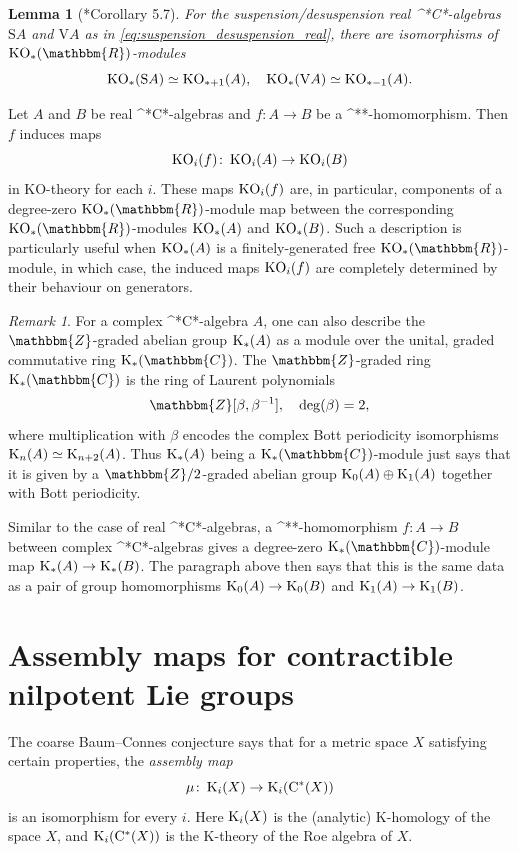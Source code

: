 \documentclass{amsart}
\numberwithin{figure}{section}
\numberwithin{equation}{section}
\numberwithin{table}{section}
\theoremstyle{plain}
\newtheorem{lemma}[equation]{Lemma}
\theoremstyle{definition}
\theoremstyle{remark}
\newtheorem{remark}[equation]{Remark}
\theoremstyle{nonumber}
\newcommand{\Z}{\mathbb{Z}}
\newcommand{\R}{\mathbb{R}}
\newcommand{\C}{\mathbb{C}}
\newcommand{\K}{\relax\ifmmode\operatorname{K}\else\textup{K}\fi}
\newcommand{\KO}{\relax\ifmmode\operatorname{KO}\else\textup{KO}\fi}
\newcommand{\st}{\relax\ifmmode{}^*\else{}\textup{*}\fi}
\newcommand{\Cst}{\relax\ifmmode\mathrm{C}^*\else\textup{C*}\fi}
\renewcommand{\mathbb}{\mathbbm} %
\begin{document}
\begin{lemma}[\cite{Boersema:Real_Cst-algebras_Kuenneth_formula}*{Corollary
5.7}]\label{lem:KO-theory_suspension_desuspension}
For the suspension/desuspension real \Cst-algebras \(\mathrm{S}A\)
and \(\mathrm{V}A\) as in \eqref{eq:suspension_desuspension_real},
there are isomorphisms of \( \KO_*(\R) \)-modules
\[ 
  \KO_*(\mathrm{S}A)\simeq\KO_{*+1}(A),\quad 
  \KO_*(\mathrm{V}A)\simeq\KO_{*-1}(A).
\]
\end{lemma}
Let \( A \) and \( B \) be real \Cst-algebras and \( f\colon A\to B \) be a
\st-homomorphism. Then \( f \) induces maps
\[
  \KO_i(f)\colon \KO_i(A)\to\KO_i(B)
\]
in KO-theory for each \( i \). These maps \( \KO_i(f) \) are, in
particular, components of a degree-zero
\( \KO_*(\R) \)-module map between the corresponding \(
\KO_*(\R) \)-modules \( \KO_*(A) \) and \( \KO_*(B) \).
Such a description is particularly useful 
  when \( \KO_*(A) \) is a finitely-generated 
  free \( \KO_*(\R) \)-module, in which case, the
induced maps \( \KO_i(f) \)  
are completely determined by their behaviour on
generators.


\begin{remark}\label{rmk:K-ring_of_C}
For a complex \Cst-algebra \( A \), one can also 
describe the \( \Z \)-graded abelian
group \( \K_*(A) \) as a module over the unital, graded commutative ring
\( \K_*(\C) \). The \( \Z \)-graded ring \( \K_*(\C) \) is the ring of Laurent polynomials
\[ 
  \Z[\beta,\beta^{-1}],\quad \deg(\beta)=2,
\]
where multiplication with \( \beta \) encodes the complex Bott periodicity
isomorphisms \( \K_n(A)\simeq\K_{n+2}(A) \). Thus
\( \K_*(A) \) being a \( \K_*(\C) \)-module just says that it is given by a
\( \Z/2 \)-graded abelian group \( \K_0(A)\oplus\K_1(A) \) together with
Bott periodicity.

Similar to the case of real \Cst-algebras,
a \st-homomorphism \( f\colon A\to B \) between complex \Cst-algebras
gives a degree-zero \( \K_*(\C) \)-module map \( \K_*(A)\to\K_*(B) \).
The paragraph above then says that this is the same data as a pair of group
homomorphisms \( \K_0(A)\to\K_0(B) \) and \( \K_1(A)\to\K_1(B) \).
\end{remark}

\section{Assembly maps for contractible nilpotent Lie groups}
\label{sec:coarse_Baum-Connes}

The coarse Baum--Connes conjecture \cite{Higson-Roe:Coarse_Baum-Connes}
says that for a metric space \( X \) satisfying certain properties, 
the \emph{assembly map}
\begin{equation}\label{eq:assembly_map}
  \mu\colon \K_i(X)\to\K_i(\Cst(X))
\end{equation}
is an isomorphism for every \( i \). 
Here \( \K_i(X) \) is the (analytic) K-homology of the
space \( X \), and \( \K_i(\Cst(X)) \) is the K-theory of the Roe algebra
of \( X \).
\end{document}
